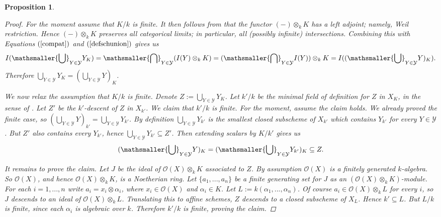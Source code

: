 \documentclass[twoside,a4paper,reqno,11pt]{amsart}
\newtheorem{proposition}[theorem]{Proposition}
\theoremstyle{definition}
\begin{document}
\begin{proposition}
\begin{proof}
\vspace{2mm}\noindent For the moment assume that $K/k$ is finite. It then follows from \cite[\S 7.6, Lem.\ 1, Thm.\ 4]{BLR} that the functor $(-)\otimes_k K$ has a left adjoint; namely, Weil restriction. %
Hence $(-)\otimes_k K$ preserves all categorical limits; in particular, all (possibly infinite) intersections. Combining this with Equations $(\ref{compat})$ and $(\ref{defschunion})$ gives us $$I(\mathsmaller{\bigcup}_{Y\in\mathcal{Y}}Y_K)%
=\mathsmaller{\bigcap}_{Y\in\mathcal{Y}}(I(Y)\otimes_k K)=(\mathsmaller{\bigcap}_{Y\in\mathcal{Y}}I(Y))\otimes_k K%
=I((\mathsmaller{\bigcup}_{Y\in\mathcal{Y}}Y)_K).$$ Therefore $\bigcup_{Y\in\mathcal{Y}}Y_K=(\bigcup_{Y\in\mathcal{Y}}Y)_K$.

\vspace{2mm}\noindent We now relax the assumption that $K/k$ is finite. Denote $Z:=\bigcup_{Y\in\mathcal{Y}}Y_K$. Let $k'/k$ be the minimal field of definition for $Z$ in $X_K$, in the sense of \cite[Def.\ 1.1.6]{CGP}. Let $Z'$ be the $k'$-descent of $Z$ in $X_{k'}$. We claim that $k'/k$ is finite. For the moment, assume the claim holds. We already proved the finite case, so $(\bigcup_{Y\in\mathcal{Y}}Y)_{k'}=\bigcup_{Y\in\mathcal{Y}}Y_{k'}$. By definition $\bigcup_{Y\in\mathcal{Y}}Y_{k'}$ is the smallest closed subscheme of $X_{k'}$ which contains $Y_{k'}$ for every $Y\in\mathcal{Y}$. But $Z'$ also contains every $Y_{k'}$, hence $\bigcup_{Y\in\mathcal{Y}}Y_{k'}\subseteq Z'$. Then extending scalars by $K/k'$ gives us $$(\mathsmaller{\bigcup}_{Y\in\mathcal{Y}}Y)_K=(\mathsmaller{\bigcup}_{Y\in\mathcal{Y}}Y_{k'})_K\subseteq Z.$$

\vspace{2mm}\noindent It remains to prove the claim. %
Let $J$ be the ideal of $\mathcal{O}(X)\otimes_k K$ associated to $Z$. By assumption $\mathcal{O}(X)$ is a finitely generated $k$-algebra. %
So $\mathcal{O}(X)$, and hence $\mathcal{O}(X)\otimes_k K$, is a Noetherian ring. Let $\{a_1,...,a_n\}$ be a finite generating set for $J$ as an $(\mathcal{O}(X)\otimes_k K)$-module. %
For each $i=1,...,n$ write $a_i=x_i\otimes\alpha_i$, where $x_i\in\mathcal{O}(X)$ and $\alpha_i\in K$. Let $L:=k(\alpha_1,...,\alpha_n)$. Of course $a_i\in\mathcal{O}(X)\otimes_k L$ for every $i$, so $J$ descends to an ideal of $\mathcal{O}(X)\otimes_k L$. Translating this to affine schemes, $Z$ descends to a closed subscheme of $X_L$. Hence $k'\subseteq L$. But $L/k$ is finite, since each $\alpha_i$ is algebraic over $k$. %
Therefore $k'/k$ is finite, proving the claim.
\end{proof}
\end{proposition}
\end{document}
